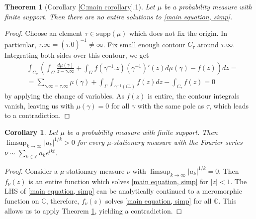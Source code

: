 \documentclass[11pt]{article}
\newtheorem{theorem}{Theorem}[section]
\newtheorem{corollary}{Corollary}[section]
\begin{document}
\begin{theorem}[Corollary \ref{C:main corollary}.1]
	\label{entire solutions}
	Let $\mu$ be a probability measure with finite support. Then there are no entire solutions to \eqref{main equation, simp}.
\end{theorem}
\begin{proof}
	Choose an element $\tau \in \text{supp}(\mu)$ which does not fix the origin. In particular, $\tau.\infty = (\overline{\tau.0})^{-1} \ne \infty$. Fix small enough contour $C_\tau$ around $\tau.\infty$. Integrating both sides over this contour, we get
	\[
	\begin{aligned}
		& \int_{C_\tau}\left( \int_G \frac{d\mu(\gamma)}{z - \gamma.\infty}  + \int_G f(\gamma^{-1}.z)(\gamma^{-1})'(z)  d\mu(\gamma) - f(z) \right) dz = \\ 
		&= \sum_{\gamma.\infty = \tau.\infty} \mu(\gamma) + \int_\Gamma \int_{\gamma^{-1}(C_\tau)} f(z) dz - \int_{C_\tau} f(z)  = 0
	\end{aligned}
	\]
	by applying the change of variables. As $f(z)$ is entire, the contour integrals vanish, leaving us with $\mu(\gamma) = 0$ for all $\gamma$ with the same pole as $\tau$, which leads to a contradiction.
\end{proof}

\begin{corollary}
	Let $\mu$ be a probability measure with finite support. Then $\limsup_{k \rightarrow \infty} |a_k|^{1/k} > 0$ for every $\mu$-stationary measure with the Fourier series $\nu \sim \sum_{k \in \mathbb{Z}} a_k e^{i k t}$.
\end{corollary}
\begin{proof}
	Consider a $\mu$-stationary measure $\nu$ with $\limsup_{k \rightarrow \infty} |a_k|^{1/k} = 0$. Then $f_\nu(z)$ is an entire function which solves \eqref{main equation, simp} for $|z| < 1$. The LHS of \eqref{main equation, simp} can be analytically continued to a meromorphic function on $\mathbb{C}$, therefore, $f_\nu(z)$ solves \eqref{main equation, simp} for all $\mathbb{C}$. This allows us to apply Theorem \ref{entire solutions}, yielding a contradiction.
\end{proof}
\end{document}
